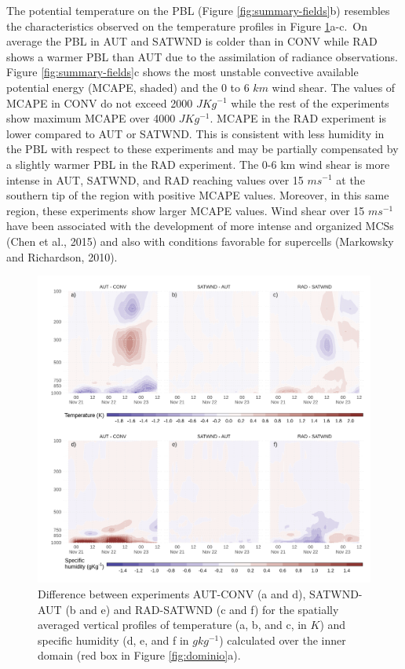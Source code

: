 \documentclass[final,5p,times,twocolumn,authoryear]{elsarticle} %
\begin{document}
The potential temperature on the PBL (Figure \ref{fig:summary-fields}b) resembles the characteristics observed on the temperature profiles in Figure \ref{fig:TQ-diff}a-c.~On average the PBL in AUT and SATWND is colder than in CONV while RAD shows a warmer PBL than AUT due to the assimilation of radiance observations. Figure \ref{fig:summary-fields}c shows the most unstable convective available potential energy (MCAPE, shaded) and the 0 to 6 \(km\) wind shear. The values of MCAPE in CONV do not exceed 2000 \(JKg^{-1}\) while the rest of the experiments show maximum MCAPE over 4000 \(JKg^{-1}\). MCAPE in the RAD experiment is lower compared to AUT or SATWND. This is consistent with less humidity in the PBL with respect to these experiments and may be partially compensated by a slightly warmer PBL in the RAD experiment. The 0-6 km wind shear is more intense in AUT, SATWND, and RAD reaching values over 15 \(ms^{-1}\) at the southern tip of the region with positive MCAPE values. Moreover, in this same region, these experiments show larger MCAPE values. Wind shear over 15 \(ms^{-1}\) have been associated with the development of more intense and organized MCSs (Chen et al., 2015) and also with conditions favorable for supercells (Markowsky and Richardson, 2010).



\begin{figure}[t]

{\centering \includegraphics{../figures/TQ-diff-1} 

}

\caption{Difference between experiments AUT-CONV (a and d), SATWND-AUT (b and e) and RAD-SATWND (c and f) for the spatially averaged vertical profiles of temperature (a, b, and c, in \(K\)) and specific humidity (d, e, and f in \(gkg^{-1}\)) calculated over the inner domain (red box in Figure \ref{fig:dominio}a).}\label{fig:TQ-diff}
\end{figure}
\end{document}
